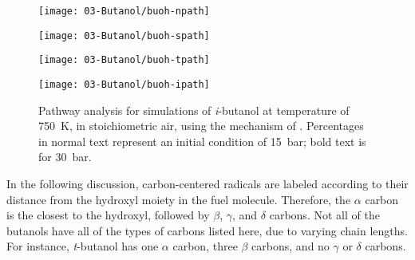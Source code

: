 \documentclass[12pt, letterpaper]{article}
\begin{document}
\begin{figure}
    \begin{floatrow}
    \ffigbox
        {\texttt{[image: 03-Butanol/buoh-npath]}}
        {\caption{Pathway analysis for simulations of \textit{n}-butanol at
            temperature of \SI{750}{\kelvin}, in stoichiometric air, using the mechanism of
            \textcite{Sarathy2012}. Percentages in normal text represent an
            initial condition of \SI{15}{\bar}; bold text is for \SI{30}{\bar}.}
        \label{fig:buoh-npath}}
    \ffigbox
        {\texttt{[image: 03-Butanol/buoh-spath]}}
        {\caption{Pathway analysis for simulations of \textit{s}-butanol at
            temperature of \SI{750}{\kelvin}, in stoichiometric air, using the mechanism of
            \textcite{Sarathy2012}. Percentages in normal text represent an
            initial condition of \SI{15}{\bar}; bold text is for \SI{30}{\bar}.}
        \label{fig:buoh-spath}}
    \end{floatrow}
    \par
    \begin{floatrow}
    \ffigbox
        {\texttt{[image: 03-Butanol/buoh-tpath]}}
        {\caption{Pathway analysis for simulations of \textit{t}-butanol at
            temperature of \SI{750}{\kelvin}, in stoichiometric air, using the mechanism of
            \textcite{Sarathy2012}. Percentages in normal text represent an
            initial condition of \SI{15}{\bar}; bold text is for \SI{30}{\bar}.}
        \label{fig:buoh-tpath}}
    \ffigbox
        {\texttt{[image: 03-Butanol/buoh-ipath]}}
        {\caption{Pathway analysis for simulations of \textit{i}-butanol at
            temperature of \SI{750}{\kelvin}, in stoichiometric air, using the mechanism of
            \textcite{Sarathy2012}. Percentages in normal text represent an
            initial condition of \SI{15}{\bar}; bold text is for \SI{30}{\bar}.}
        \label{fig:buoh-ipath}}
    \end{floatrow}
\end{figure}

In the following discussion, carbon-centered radicals are labeled according to
their distance from the hydroxyl moiety in the fuel molecule. Therefore, the
$\alpha$ carbon is the closest to the hydroxyl, followed by $\beta$, $\gamma$,
and $\delta$ carbons. Not all of the butanols have all of the types of carbons
listed here, due to varying chain lengths. For instance, \textit{t}-butanol has
one $\alpha$ carbon, three $\beta$ carbons, and no $\gamma$ or $\delta$ carbons.
\end{document}
